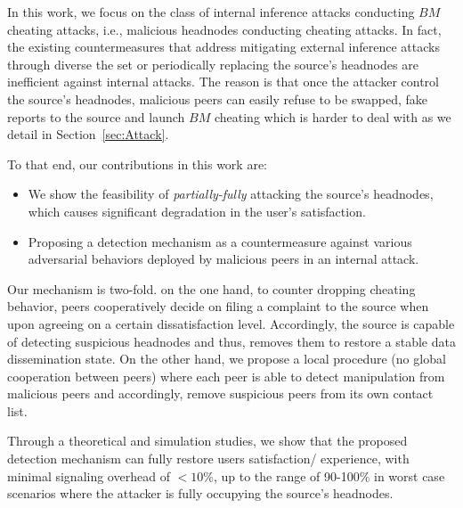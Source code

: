 In this work, we focus on the class of internal inference attacks conducting $BM$ cheating attacks, i.e., malicious headnodes conducting cheating attacks.
In fact, the existing countermeasures that address mitigating external inference attacks through diverse the set or periodically replacing the source's headnodes are inefficient against internal attacks.
The reason is that once the attacker control the source's headnodes, malicious peers can easily refuse to be swapped, fake reports to the source and launch $BM$ cheating which is harder to deal with as we detail in Section~\ref{sec:Attack}.

To that end, our contributions in this work are:
\begin{itemize}
 \item We show the feasibility of \textit{partially-fully} attacking the source's headnodes, which causes significant degradation in the user's satisfaction.
 \item Proposing a detection mechanism as a countermeasure against various adversarial behaviors deployed by malicious peers in an internal attack.
\end{itemize}

Our mechanism is two-fold. on the one hand, to counter dropping cheating behavior, peers cooperatively decide on filing a complaint to the source when upon agreeing on a certain dissatisfaction level.
Accordingly, the source is capable of detecting suspicious headnodes and thus, removes them to restore a stable data dissemination state.
On the other hand, we propose a local procedure (no global cooperation between peers) where each peer is able to detect manipulation from malicious peers and accordingly, remove suspicious peers from its own contact list.

Through a theoretical and simulation studies, we show that the proposed detection mechanism can fully restore users satisfaction/ experience, with minimal signaling overhead of $<10\%$, up to the range of 90-100\% in worst case scenarios where the attacker is fully occupying the source's headnodes.

% 
